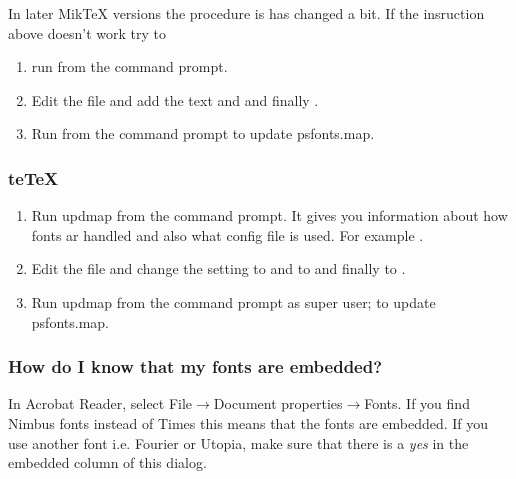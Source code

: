 \vspace{13pt}

\noindent In later Mik\TeX{} versions the procedure is has changed a bit. If the insruction above doesn't work try to
\begin{enumerate}
	\item run  from the command prompt.
	\item \raggedright Edit the file and add the text  and   and finally .
	\item Run  from the command prompt to update psfonts.map.
\end{enumerate}

\subsubsection{te\TeX{}}
\begin{enumerate}
	\item Run updmap from the command prompt. It gives you information about how fonts ar handled and also what config file is used. For example .
	\item \raggedright Edit the file and change the setting  to  and  to  and finally  to .
		\item Run updmap from the command prompt as super user;  to update psfonts.map.
\end{enumerate}

\subsubsection{How do I know that my fonts are embedded?}
In Acrobat Reader, select File\(\rightarrow\)Document properties\(\rightarrow\)Fonts. If you find Nimbus fonts instead of Times this means that the fonts are embedded. If you use another font i.e. Fourier or Utopia, make sure that there is a \emph{yes} in the embedded column of this dialog.

